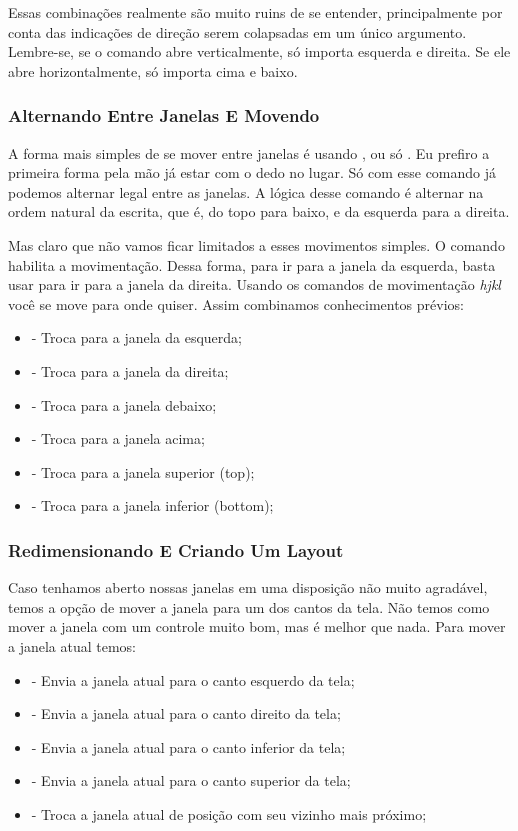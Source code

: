 \documentclass[a4paper, 12pt]{article}
\begin{document}
Essas combinações realmente são muito ruins de se entender, principalmente por conta das indicações de direção
serem colapsadas em um único argumento.
Lembre-se, se o comando abre verticalmente, só importa esquerda e direita.
Se ele abre horizontalmente, só importa cima e baixo.

\subsubsection{Alternando Entre Janelas E Movendo}
A forma mais simples de se mover entre janelas é usando , ou só .
Eu prefiro a primeira forma pela mão já estar com o dedo no lugar.
Só com esse comando já podemos alternar legal entre as janelas. 
A lógica desse comando é alternar na ordem natural da escrita, que é, do topo para baixo, e da esquerda para a direita.

Mas claro que não vamos ficar limitados a esses movimentos simples.
O comando  habilita a movimentação.
Dessa forma, para ir para a janela da esquerda, basta usar  para ir para a janela da direita.
Usando os comandos de movimentação \textit{hjkl} você se move para onde quiser.
Assim combinamos conhecimentos prévios:
\begin{itemize}
    \item {} - Troca para a janela da esquerda;
    \item {} - Troca para a janela da direita;
    \item {} - Troca para a janela debaixo;
    \item {} - Troca para a janela acima;
    \item {} - Troca para a janela superior (top);
    \item {} - Troca para a janela inferior (bottom);
\end{itemize}

\subsubsection{Redimensionando E Criando Um Layout}
Caso tenhamos aberto nossas janelas em uma disposição não muito agradável,
temos a opção de mover a janela para um dos cantos da tela.
Não temos como mover a janela com um controle muito bom, mas é melhor que nada.
Para mover a janela atual temos:

\begin{itemize}
    \item {} - Envia a janela atual para o canto esquerdo da tela;
    \item {} - Envia a janela atual para o canto direito da tela;
    \item {} - Envia a janela atual para o canto inferior da tela;
    \item {} - Envia a janela atual para o canto superior da tela;
    \item {} - Troca a janela atual de posição com seu vizinho mais próximo;
\end{itemize}
\end{document}
